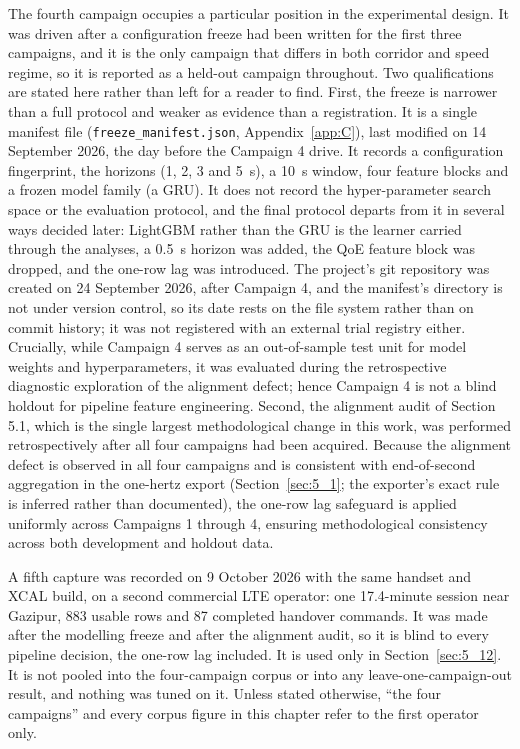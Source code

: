 The fourth campaign occupies a particular position in the experimental design. It was driven after a configuration freeze had been written for the first three campaigns, and it is the only campaign that differs in both corridor and speed regime, so it is reported as a held-out campaign throughout. Two qualifications are stated here rather than left for a reader to find. First, the freeze is narrower than a full protocol and weaker as evidence than a registration. It is a single manifest file (\texttt{freeze\_manifest.json}, Appendix~\ref{app:C}), last modified on 14 September 2026, the day before the Campaign 4 drive. It records a configuration fingerprint, the horizons (1, 2, 3 and 5~s), a 10~s window, four feature blocks and a frozen model family (a GRU). It does not record the hyper-parameter search space or the evaluation protocol, and the final protocol departs from it in several ways decided later: LightGBM rather than the GRU is the learner carried through the analyses, a 0.5~s horizon was added, the QoE feature block was dropped, and the one-row lag was introduced. The project's git repository was created on 24 September 2026, after Campaign 4, and the manifest's directory is not under version control, so its date rests on the file system rather than on commit history; it was not registered with an external trial registry either. Crucially, while Campaign 4 serves as an out-of-sample test unit for model weights and hyperparameters, it was evaluated during the retrospective diagnostic exploration of the alignment defect; hence Campaign 4 is not a blind holdout for pipeline feature engineering. Second, the alignment audit of Section 5.1, which is the single largest methodological change in this work, was performed retrospectively after all four campaigns had been acquired. Because the alignment defect is observed in all four campaigns and is consistent with end-of-second aggregation in the one-hertz export (Section~\ref{sec:5_1}; the exporter's exact rule is inferred rather than documented), the one-row lag safeguard is applied uniformly across Campaigns 1 through 4, ensuring methodological consistency across both development and holdout data.

A fifth capture was recorded on 9 October 2026 with the same handset and XCAL build, on a second commercial LTE operator: one 17.4-minute session near Gazipur, 883 usable rows and 87 completed handover commands. It was made after the modelling freeze and after the alignment audit, so it is blind to every pipeline decision, the one-row lag included. It is used only in Section~\ref{sec:5_12}. It is not pooled into the four-campaign corpus or into any leave-one-campaign-out result, and nothing was tuned on it. Unless stated otherwise, ``the four campaigns'' and every corpus figure in this chapter refer to the first operator only.


